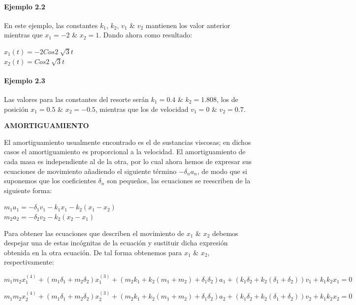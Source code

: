 \vspace{3cm}

\paragraph{\textbf{Ejemplo 2.2}}
En este ejemplo, las constantes $k_1$, $k_2$, $v_1$ \& $v_2$ mantienen los valor anterior mientras que $x_1 = -2$ \& $x_2 = 1$.
Dando ahora como resultado:

\begin{center}
	$x_1(t) = -2 Cos 2 \sqrt[]{3} t$
    \\ $x_2(t) = Cos 2 \sqrt[]{3} t$
\end{center}

\paragraph{\textbf{Ejemplo 2.3}}
Las valores para las constantes del resorte serán $k_1 = 0.4$ \& $k_2 = 1.808$, los de posición $x_1 = 0.5$ \& $x_2 = -0.5$, mientras que los de velocidad $v_1 = 0$ \& $v_2 = 0.7$. \\

\begin{center}
	\textbf{AMORTIGUAMIENTO}
\end{center}

\noindent El amortiguamiento usualmente encontrado es el de sustancias viscosas; en dichos casos el amortiguamiento es proporcional a la velocidad. El amortiguamiento de cada masa es independiente al de la otra, por lo cual ahora hemos de expresar sus ecuaciones de movimiento añadiendo el siguiente término $-\delta_n a_n$, de modo que si suponemos que los coeficientes $\delta_n$  son pequeños, las ecuaciones se reescriben de la siguiente forma:

\begin{center}
	$ m_1a_1 = -\delta_1v_1-k_1x_1-k_2(x_1-x_2) $ \\
    $ m_2a_2 = -\delta_2v_2-k_2(x_2-x_1) $
\end{center}

Para obtener las ecuaciones que describen el movimiento de $x_1$ \& $x_2$ debemos despejar una de estas incógnitas de la ecuación y sustituir dicha expresión obtenida en la otra ecuación. De tal forma obtenemos para $x_1$ \& $x_2$, respectivamente:

\begin{center}
	$m_1m_2x_1^{(4)}+(m_1\delta_1+m_2\delta_2)x_1^{(3)}+(m_2k_1+k_2(m_1+m_2)+\delta_1\delta_2)a_1+(k_1\delta_2+k_2(\delta_1+\delta_2))v_1+k_1k_2x_1=0$ 
    
    \vspace{0.5cm}
    
    $m_1m_2x_2^{(4)}+(m_1\delta_1+m_2\delta_2)x_2^{(3)}+(m_2k_1+k_2(m_1+m_2)+\delta_1\delta_2)a_2+(k_1\delta_2+k_2(\delta_1+\delta_2))v_2+k_1k_2x_2=0$
\end{center}

